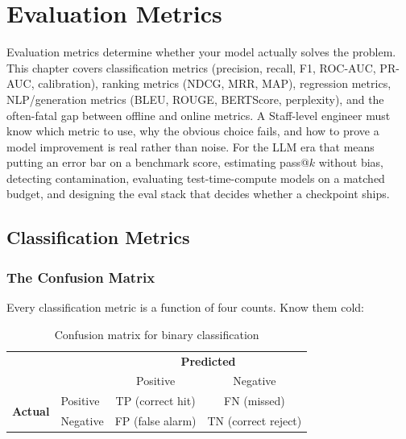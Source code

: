 \chapter{Evaluation Metrics}
\label{chap:evaluation_metrics}

\begin{tldr}
Evaluation metrics determine whether your model actually solves the problem. This chapter covers classification metrics (precision, recall, F1, ROC-AUC, PR-AUC, calibration), ranking metrics (NDCG, MRR, MAP), regression metrics, NLP/generation metrics (BLEU, ROUGE, BERTScore, perplexity), and the often-fatal gap between offline and online metrics. A Staff-level engineer must know which metric to use, why the obvious choice fails, and how to prove a model improvement is real rather than noise. For the LLM era that means putting an error bar on a benchmark score, estimating pass@$k$ without bias, detecting contamination, evaluating test-time-compute models on a matched budget, and designing the eval stack that decides whether a checkpoint ships.
\end{tldr}

\section{Classification Metrics}
\label{sec:classification_metrics}

\subsection{The Confusion Matrix}

Every classification metric is a function of four counts. Know them cold:

\begin{table}[H]
\centering
\caption{Confusion matrix for binary classification}
\begin{tabular}{ll|cc}
\toprule
& & \multicolumn{2}{c}{\textbf{Predicted}} \\
& & Positive & Negative \\
\midrule
\multirow{2}{*}{\textbf{Actual}} & Positive & TP (correct hit) & FN (missed) \\
& Negative & FP (false alarm) & TN (correct reject) \\
\bottomrule
\end{tabular}
\end{table}

